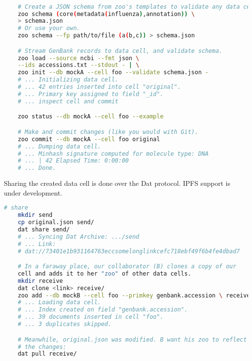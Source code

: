 \begin{minipage}{\linewidth}
\begin{lstlisting}[language=bash]

    # Create a JSON schema from zoo's templates to validate any data cell insertions.
    zoo schema (core(metadata(influenza),annotation)) \
    > schema.json
    # Or use your own.
    zoo schema --fp path/to/file (a(b,c)) > schema.json

    # Stream GenBank records to data cell, and validate schema.
    zoo load --source ncbi --fmt json \
    --ids accessions.txt --stdout - | \
    zoo init --db mockA --cell foo --validate schema.json -
    # ... Initializing data cell.
    # ... 42 entries inserted into cell "original".
    # ... Primary key assigned to field "_id".
    # ... inspect cell and commit

    zoo status --db mockA --cell foo --example

    # Make and commit changes (like you would with Git).
    zoo commit --db mockA --cell foo original
    # ... Dumping data cell.
    # ... Minhash signature computed for molecule type: DNA
    # ... | 42 Elapsed Time: 0:00:00
    # ... Done.
\end{lstlisting}
\end{minipage}


Sharing the created data cell is done over the Dat protocol. IPFS support is under development.


\begin{minipage}{\linewidth}
\begin{lstlisting}[language=bash]
    # share
    mkdir send
    cp original.json send/
    dat share send/
    # ... Syncing Dat Archive: .../send
    # ... Link:
    # dat://73401e1b931164763eccsomelonglinkcefc718ebf49f6b4fe4dbad7

    # In a faraway place, our collaborator (B) clones a copy of our
    cell and adds it to her "zoo" of other data cells.
    mkdir receive
    dat clone <link> receive/
    zoo add --db mockB --cell foo --primkey genbank.accession \ receive/original.json
    # ... Loading data cell.
    # ... Index created on field "genbank.accession".
    # ... 39 documents inserted in cell "foo".
    # ... 3 duplicates skipped.

    # Meanwhile, original.json was modified. B want his zoo to reflect
    # the changes:
    dat pull receive/
\end{lstlisting}
\end{minipage}


